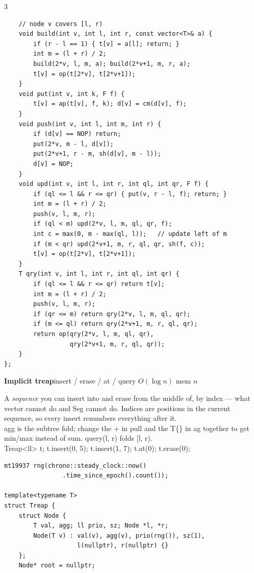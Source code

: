 \documentclass[9pt,a4paper]{extarticle}
\newcommand{\entry}[3]{%
  \addcontentsline{toc}{subsection}{#1}%
  \vspace{0.8ex}%
  \noindent\colorbox{hdbg}{\parbox{\dimexpr\columnwidth-2\fboxsep}{%
    \strut\textbf{#1}\hfill{\footnotesize\textsf{#2}}}}\par
  \vspace{0.4ex}%
  {\footnotesize #3\par}%
}
\newcommand{\code}[1]{{\ttfamily\small #1}}
\begin{document}
\begin{multicols*}{3}
\begin{lstlisting}
    // node v covers [l, r)
    void build(int v, int l, int r, const vector<T>& a) {
        if (r - l == 1) { t[v] = a[l]; return; }
        int m = (l + r) / 2;
        build(2*v, l, m, a); build(2*v+1, m, r, a);
        t[v] = op(t[2*v], t[2*v+1]);
    }
    void put(int v, int k, F f) {
        t[v] = ap(t[v], f, k); d[v] = cm(d[v], f);
    }
    void push(int v, int l, int m, int r) {
        if (d[v] == NOP) return;
        put(2*v, m - l, d[v]);
        put(2*v+1, r - m, sh(d[v], m - l));
        d[v] = NOP;
    }
    void upd(int v, int l, int r, int ql, int qr, F f) {
        if (ql <= l && r <= qr) { put(v, r - l, f); return; }
        int m = (l + r) / 2;
        push(v, l, m, r);
        if (ql < m) upd(2*v, l, m, ql, qr, f);
        int c = max(0, m - max(ql, l));   // update left of m
        if (m < qr) upd(2*v+1, m, r, ql, qr, sh(f, c));
        t[v] = op(t[2*v], t[2*v+1]);
    }
    T qry(int v, int l, int r, int ql, int qr) {
        if (ql <= l && r <= qr) return t[v];
        int m = (l + r) / 2;
        push(v, l, m, r);
        if (qr <= m) return qry(2*v, l, m, ql, qr);
        if (m <= ql) return qry(2*v+1, m, r, ql, qr);
        return op(qry(2*v, l, m, ql, qr),
                  qry(2*v+1, m, r, ql, qr));
    }
};
\end{lstlisting}

\entry{Implicit treap}{insert / erase / at / query $O(\log n)$ \quad mem $n$}{%
A \emph{sequence} you can insert into and erase from the middle of, by index --- what
\code{vector} cannot do and \code{Seg} cannot do. Indices are positions in the
current sequence, so every insert renumbers everything after it.\\[0.3ex]
\code{agg} is the subtree fold; change the \code{+} in \code{pull} and the \code{T\{\}}
in \code{ag} together to get min/max instead of sum. \code{query(l, r)} folds
\code{[l, r)}.\\[0.3ex]
\code{Treap<ll> t; t.insert(0, 5); t.insert(1, 7); t.at(0); t.erase(0);}}

\begin{lstlisting}
mt19937 rng(chrono::steady_clock::now()
                .time_since_epoch().count());

template<typename T>
struct Treap {
    struct Node {
        T val, agg; ll prio, sz; Node *l, *r;
        Node(T v) : val(v), agg(v), prio(rng()), sz(1),
                    l(nullptr), r(nullptr) {}
    };
    Node* root = nullptr;


\end{lstlisting}
\end{multicols*}
\end{document}

